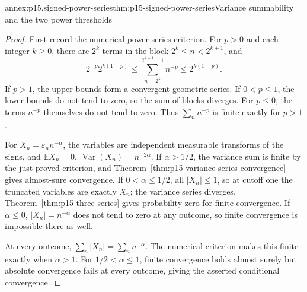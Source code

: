 \begin{annexitem}{annex:p15.signed-power-series}{thm:p15-signed-power-series}{Variance summability and the two power thresholds}
\begin{proof}
First record the numerical power-series criterion. For \(p>0\)
and each integer \(k\geq0\), there are \(2^k\) terms in the
block \(2^k\leq n<2^{k+1}\), and
\[
 2^{-p}2^{k(1-p)}
       \leq\sum_{n=2^k}^{2^{k+1}-1}n^{-p}
       \leq2^{k(1-p)}.
\]
If \(p>1\), the upper bounds form a convergent geometric series.
If \(0<p\leq1\), the lower bounds do not tend to zero, so the
sum of blocks diverges. For \(p\leq0\), the terms \(n^{-p}\)
themselves do not tend to zero. Thus \(\sum_nn^{-p}\) is finite
exactly for \(p>1\).

For \(X_n=\varepsilon_nn^{-\alpha}\), the variables are
independent measurable transforms of the signs, and
\(\mathbb EX_n=0\), \(\operatorname{Var}(X_n)=n^{-2\alpha}\).
If \(\alpha>1/2\), the variance sum is finite by the just-proved
criterion, and Theorem~\ref{thm:p15-variance-series-convergence}
gives almost-sure convergence.
If \(0<\alpha\leq1/2\), all \(|X_n|\leq1\), so at cutoff
one the truncated variables are exactly \(X_n\); the variance
series diverges. Theorem~\ref{thm:p15-three-series} gives
probability zero for finite convergence. If \(\alpha\leq0\),
\(|X_n|=n^{-\alpha}\) does not tend to zero at any outcome, so
finite convergence is impossible there as well.

At every outcome, \(\sum_n|X_n|=\sum_nn^{-\alpha}\).
The numerical criterion makes this finite exactly when \(\alpha>1\).
For \(1/2<\alpha\leq1\), finite convergence holds almost surely
but absolute convergence fails at every outcome, giving the asserted
conditional convergence.
\end{proof}
\end{annexitem}

